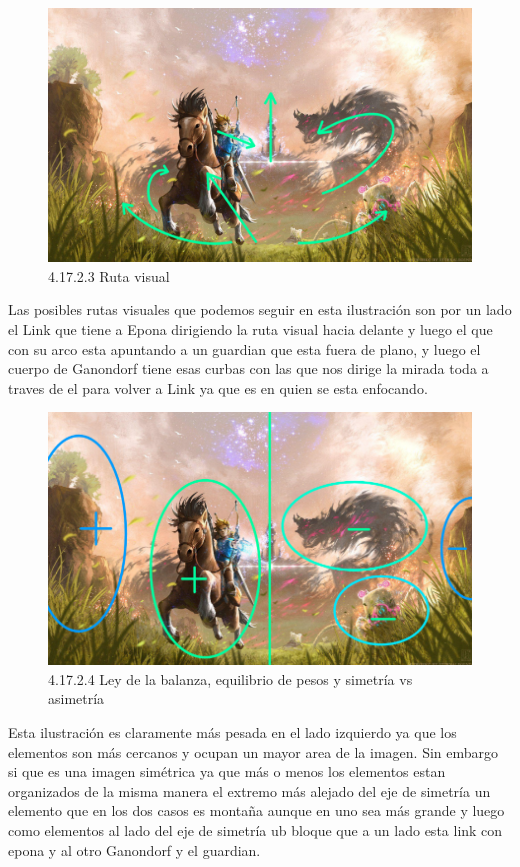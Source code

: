 \documentclass[12pt]{article}
\begin{document}
      \begin{figure}[H]
        \centering
        \includegraphics[scale=0.7]{images/Saúl/Sección 17/EA_img17_2Composicion_3RutaVisual.png}
        \caption{\small 4.17.2.3 Ruta visual}
      \end{figure}
      Las posibles rutas visuales que podemos seguir en esta ilustración son por un lado el Link que tiene a Epona dirigiendo la ruta visual hacia delante y luego el que con su arco esta apuntando a un guardian que esta fuera de plano, y luego el cuerpo de Ganondorf tiene esas curbas con las que nos dirige la mirada toda a traves de el para volver a Link ya que es en quien se esta enfocando.


      \begin{figure}[H]
        \centering
        \includegraphics[scale=0.7]{images/Saúl/Sección 17/EA_img17_2Composicion_4LeyBalanza-Simetria.png}
        \caption{\small 4.17.2.4 Ley de la balanza, equilibrio de pesos y simetría vs asimetría}
      \end{figure}
      Esta ilustración es claramente más pesada en el lado izquierdo ya que los elementos son más cercanos y ocupan un mayor area de la imagen. Sin embargo si que es una imagen simétrica ya que más o menos los elementos estan organizados de la misma manera el extremo más alejado del eje de simetría un elemento que en los dos casos es montaña aunque en uno sea más grande y luego como elementos al lado del eje de simetría ub bloque que a un lado esta link con epona y al otro Ganondorf y el guardian.
\end{document}
